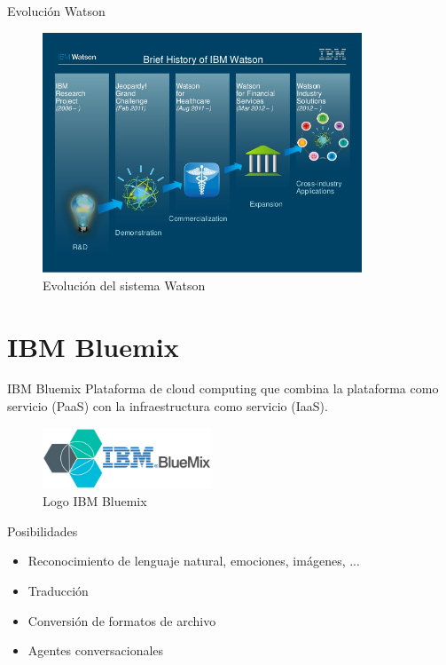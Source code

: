 \documentclass[compress]{beamer}
\begin{document}
\begin{frame}{Evolución Watson}
	\begin{figure}[H]
		\centering
		\label{watson2today}
		\includegraphics[trim = 0mm 14mm 0mm 10mm, clip, width=0.85\textwidth]{./Imagenes/watson2today.jpg}
		\caption{Evolución del sistema Watson}
	\end{figure}
\end{frame}

\section{IBM Bluemix}
\begin{frame}{IBM Bluemix}
	Plataforma de cloud computing que combina la plataforma como servicio
	(PaaS) con la infraestructura como servicio (IaaS).
	\begin{figure}[H]
		\centering
		\label{ibm-bluemix.jpg}
		\includegraphics[width=0.45\textwidth]{./Imagenes/ibm-bluemix.jpg}
		\caption{Logo IBM Bluemix}
	\end{figure}

	\begin{exampleblock}{Posibilidades}
		\begin{itemize}
			\item Reconocimiento de lenguaje natural, emociones, imágenes, ...
			\item Traducción
			\item Conversión de formatos de archivo
			\item Agentes conversacionales
		\end{itemize}
	\end{exampleblock}
\end{frame}
\end{document}
